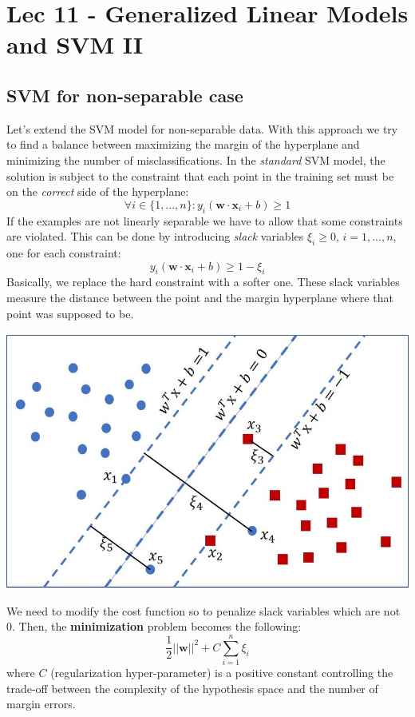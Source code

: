 \chapter{Lec 11 - Generalized Linear Models and SVM II}
\section{SVM for non-separable case}
Let's extend the SVM model for non-separable data. With this approach we try to find a balance between maximizing the margin of the hyperplane and minimizing the number of misclassifications.\newline\newline
In the \textit{standard} SVM model, the solution is subject to the constraint that each point in the training set must be on the \textit{correct} side of the hyperplane:
\[\forall i \in \{1,...,n\}: y_{i}(\textbf{w} \cdot \textbf{x}_{i} + b) \geq 1\]
If the examples are not linearly separable we have to allow that some constraints are violated. This can be done by introducing \textit{slack} variables $\xi_{i} \geq 0$, $i = 1,...,n$, one for each constraint:
\[y_{i}(\textbf{w} \cdot \textbf{x}_{i} + b) \geq 1 - \xi_{i}\]
Basically, we replace the hard constraint with a softer one. These slack variables measure the distance between the point and the margin hyperplane where that point was supposed to be.
\begin{center}
    \includegraphics[scale = 0.7]{images/slack var.png}
\end{center}
We need to modify the cost function so to penalize slack variables which are not 0. Then, the \textbf{minimization} problem becomes the following:
\[\frac{1}{2}||\textbf{w}||^{2} + C\sum_{i = 1}^{n}\xi_{i}\]
where $C$ (regularization hyper-parameter) is a positive constant controlling the trade-off between the complexity of the hypothesis space and the number of margin errors.\newline\newline
